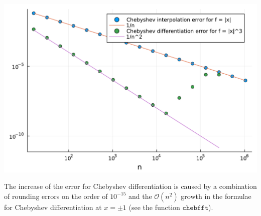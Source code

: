 \documentclass[12pt,a4paper]{article}
\begin{document}
\includegraphics[width=\linewidth]{jl_P71Faz/Chapter3_20_1.pdf}

The increase of the error for Chebyshev differentiation is caused by a combination of rounding errors on the order of $10^{-15}$ and the $\mathcal{O}(n^2)$ growth in the formulae for Chebyshev differentiation at $x = \pm 1$ (see the function $\texttt{chebfft}$).
\end{document}
